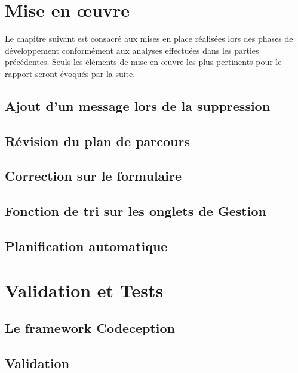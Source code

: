 \documentclass[noposter]{polytech/polytech}
\begin{document}
\chapter{Mise en œuvre}


Le chapitre suivant est consacré aux mises en place réalisées lors des phases de développement conformément aux analyses effectuées dans les parties précédentes. Seuls les éléments de mise en œuvre les plus pertinents pour le rapport seront évoqués par la suite.


\section{Ajout d'un message lors de la suppression}




\section{Révision du plan de parcours}


\section{Correction sur le formulaire}


\section{Fonction de tri sur les onglets de Gestion}


\section{Planification automatique}



\chapter{Validation et Tests}


\section{Le framework Codeception}


\section{Validation }
\end{document}
